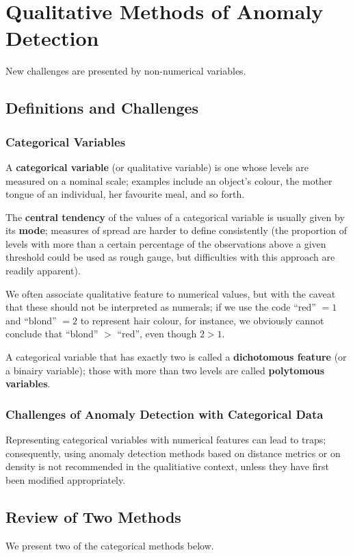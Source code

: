 \section{Qualitative Methods of Anomaly Detection}\label{Section:3}
New challenges are presented by non-numerical variables. 
\subsection{Definitions and Challenges}
\subsubsection*{Categorical Variables}
A \textbf{categorical variable} (or qualitative variable) is one whose levels are measured on a nominal scale; examples include an object's colour, the mother tongue of an individual, her favourite meal, and so forth.  

The \textbf{central tendency} of the values of a categorical variable is usually given by its \textbf{mode}; measures of spread are harder to define consistently (the proportion of levels with more than a certain percentage of the observations above a given threshold could be used as rough gauge, but difficulties with this approach are readily apparent). 

We often associate qualitative feature to numerical values, but with the caveat that these should not be interpreted as numerals; if we use the code  ``red'' $=1$ and ``blond'' $=2$ to represent hair colour, for instance, we obviously cannot conclude that ``blond'' $>$ ``red'', even though $2>1$.   

A categorical variable that has exactly two  is called a \textbf{dichotomous feature} (or a binairy variable); those with more than two levels are called  \textbf{polytomous variables}. %



\subsubsection*{Challenges of Anomaly Detection with  Categorical Data}
Representing categorical variables with numerical features can lead to traps; consequently, using anomaly detection methods based on distance metrics or on density is not recommended in the qualitiative context, unless they have first been modified appropriately. 
\subsection{Review of Two Methods}
We present two of the categorical methods below. 
